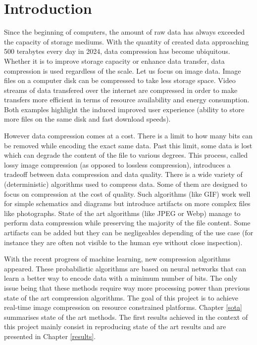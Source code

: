 \chapter*{Introduction}
Since the beginning of computers, the amount of raw data has always exceeded the capacity of storage mediums. With the quantity of created data approaching 500 terabytes every day in 2024, data compression has become ubiquitous. Whether it is to improve storage capacity or enhance data transfer, data compression is used regardless of the scale. Let us focus on image data. Image files on a computer disk can be compressed to take less storage space. Video streams of data transfered over the internet are compressed in order to make transfers more efficient in terms of resource availability and energy consumption. Both examples highlight the induced improved user experience (ability to store more files on the same disk and fast download speeds).

However data compression comes at a cost. There is a limit to how many bits can be removed while encoding the exact same data. Past this limit, some data is lost which can degrade the content of the file to various degrees. This process, called lossy image compression (as opposed to lossless compression), introduces a tradeoff between data compression and data quality. There is a wide variety of (deterministic) algorithms used to compress data. Some of them are designed to focus on compression at the cost of quality. Such algorithms (like GIF) work well for simple schematics and diagrams but introduce artifacts on more complex files like photographs. State of the art algorithms (like JPEG or Webp) manage to perform data compression while preserving the majority of the file content. Some artifacts can be added but they can be negligeables depending of the use case (for instance they are often not visible to the human eye without close inspection).

With the recent progress of machine learning, new compression algorithms appeared. These probabilistic algorithms are based on neural networks that can learn a better way to encode data with a minimum number of bits. The only issue being that these methods require way more processing power than previous state of the art compression algorithms. The goal of this project is to achieve real-time image compression on resource constrained platforms. Chapter \ref{sota} summarises state of the art methods. The first results achieved in the context of this project mainly consist in reproducing state of the art results and are presented in Chapter \ref{results}.
